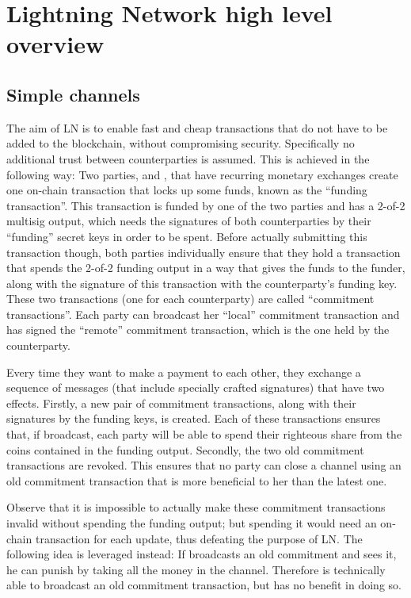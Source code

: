 \section{Lightning Network high level overview}
  \subsection{Simple channels}
    The aim of LN is to enable fast and cheap transactions that do not have to
    be added to the blockchain, without compromising security. Specifically no
    additional trust between counterparties is assumed. This is achieved in the
    following way: Two parties, \alice{} and \bob, that have recurring monetary
    exchanges create one on-chain transaction that locks up some funds, known as
    the ``funding transaction''. This transaction is funded by one of the two
    parties and has a 2-of-2 multisig output, which needs the signatures of both
    counterparties by their ``funding'' secret keys in order to be spent.
    Before actually submitting this transaction though, both parties
    individually ensure that they hold a transaction that spends the 2-of-2
    funding output in a way that gives the funds to the funder, along with the
    signature of this transaction with the counterparty's funding key. These two
    transactions (one for each counterparty) are called ``commitment
    transactions''. Each party can broadcast her ``local'' commitment
    transaction and has signed the ``remote'' commitment transaction, which is
    the one held by the counterparty.

    Every time they want to make a payment to each other, they exchange a
    sequence of messages (that include specially crafted signatures) that have
    two effects.  Firstly, a new pair of commitment transactions, along with
    their signatures by the funding keys, is created. Each of these transactions
    ensures that, if broadcast, each party will be able to spend their righteous
    share from the coins contained in the funding output.  Secondly, the two old
    commitment transactions are revoked.  This ensures that no party can close a
    channel using an old commitment transaction that is more beneficial to her
    than the latest one.

    Observe that it is impossible to actually make these commitment transactions
    invalid without spending the funding output; but spending it would need an
    on-chain transaction for each update, thus defeating the purpose of LN. The
    following idea is leveraged instead: If \alice{} broadcasts an old
    commitment and \bob{} sees it, he can punish \alice{} by taking all the
    money in the channel. Therefore \alice{} is technically able to broadcast an
    old commitment transaction, but has no benefit in doing so.

